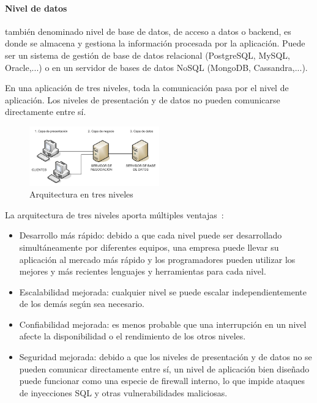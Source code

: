 \paragraph{Nivel de datos} también denominado nivel de base de datos, de acceso a datos o backend, es donde se almacena y gestiona la información procesada por la aplicación. Puede ser un sistema de gestión de base de datos relacional (PostgreSQL, MySQL, Oracle,...) o en un servidor de bases de datos NoSQL (MongoDB, Cassandra,...). 


En una aplicación de tres niveles, toda la comunicación pasa por el nivel de aplicación. Los niveles de presentación y de datos no pueden comunicarse directamente entre sí.

\begin{figure}[H]
  \centering
  \includegraphics[width=0.50\textwidth]{imaxes/arquitectura-3-niveles.png}
  \caption{Arquitectura en tres niveles}
  \label{fig:arquitectura-3-niveles}
\end{figure}


La arquitectura de tres niveles aporta múltiples ventajas~\cite{ibmMVC}:

\begin{itemize}
\item Desarrollo más rápido: debido a que cada nivel puede ser desarrollado simultáneamente por diferentes equipos, una empresa puede llevar su aplicación al mercado más rápido y los programadores pueden utilizar los mejores y más recientes lenguajes y herramientas para cada nivel.
\item Escalabilidad mejorada: cualquier nivel se puede escalar independientemente de los demás según sea necesario.
\item Confiabilidad mejorada: es menos probable que una interrupción en un nivel afecte la disponibilidad o el rendimiento de los otros niveles.
\item Seguridad mejorada: debido a que los niveles de presentación y de datos no se pueden comunicar directamente entre sí, un nivel de aplicación bien diseñado puede funcionar como una especie de firewall interno, lo que impide ataques de inyecciones SQL y otras vulnerabilidades maliciosas.
\end{itemize}


